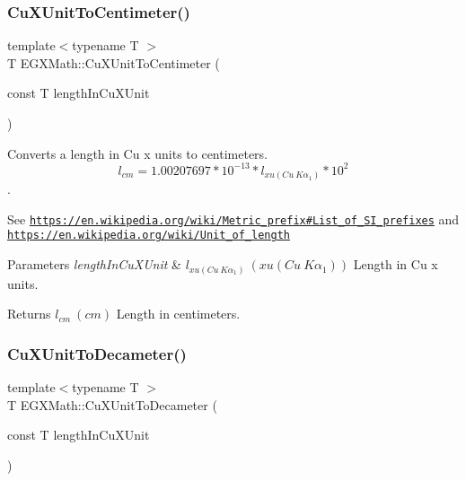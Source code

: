 \subsubsection{\texorpdfstring{Cu\+X\+Unit\+To\+Centimeter()}{CuXUnitToCentimeter()}}
{\footnotesize\ttfamily template$<$typename T $>$ \\
T E\+G\+X\+Math\+::\+Cu\+X\+Unit\+To\+Centimeter (\begin{DoxyParamCaption}\item[{const T}]{length\+In\+Cu\+X\+Unit }\end{DoxyParamCaption})}



Converts a length in Cu x units to centimeters. \[ l_{cm}=1.00207697*10^{-13} * l_{xu(Cu\ K\alpha_1)} * 10^{2} \]. 

See \href{https://en.wikipedia.org/wiki/Metric_prefix#List_of_SI_prefixes}{\tt https\+://en.\+wikipedia.\+org/wiki/\+Metric\+\_\+prefix\#\+List\+\_\+of\+\_\+\+S\+I\+\_\+prefixes} and \href{https://en.wikipedia.org/wiki/Unit_of_length}{\tt https\+://en.\+wikipedia.\+org/wiki/\+Unit\+\_\+of\+\_\+length} 
\begin{DoxyParams}{Parameters}
{\em length\+In\+Cu\+X\+Unit} & $ l_{xu(Cu\ K\alpha_1)}\ (xu(Cu\ K\alpha_1))$ Length in Cu x units. \\
\hline
\end{DoxyParams}
\begin{DoxyReturn}{Returns}
$ l_{cm}\ (cm)$ Length in centimeters. 
\end{DoxyReturn}
\mbox{\label{group___e_g_x_math-_conversions-_length_conversions-_non-_s_i-_cu_x_unit-_s_i_ga6cf28db3962415cbd82d90f2df49a8e2}} 
\subsubsection{\texorpdfstring{Cu\+X\+Unit\+To\+Decameter()}{CuXUnitToDecameter()}}
{\footnotesize\ttfamily template$<$typename T $>$ \\
T E\+G\+X\+Math\+::\+Cu\+X\+Unit\+To\+Decameter (\begin{DoxyParamCaption}\item[{const T}]{length\+In\+Cu\+X\+Unit }\end{DoxyParamCaption})}



